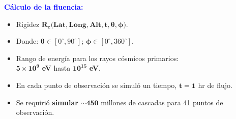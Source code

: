     \begin{frame}{} %
        \justifying %
        \vspace*{-0.4cm} %

        \begin{columns}
            \begin{column}{0.6\textwidth} %
                \textcolor{blue}{\textbf{Cálculo de la fluencia:}}
                \begin{itemize}
                    \item Rigidez $\mathbf{R_{c}(Lat, Long, Alt, t}, \bm{\theta}, \bm{\phi})$.
                    \item Donde: $\bm{\theta} \in [0^{\circ}, 90^{\circ}]$; $\bm{\phi} \in [0^{\circ}, 360^{\circ}]$.
                    \item Rango de energía para los rayos cósmicos primarios: \\$\mathbf{5 \times 10^{9}}$ \textbf{eV} hasta $\mathbf{10^{15}}$ \textbf{eV}. %
                    \item En cada punto de observación se simuló un tiempo, $\mathbf{t = 1}$ hr de flujo.
                    \item Se requirió \textbf{simular} $\mathbf{\sim 450}$  millones de cascadas para 41 puntos de observación.
                \end{itemize}
            \end{column}
            

\end{columns}
\end{frame}
